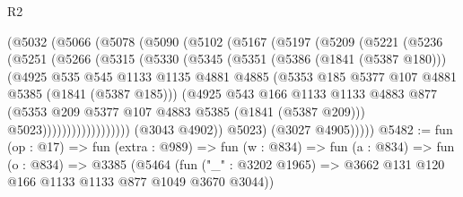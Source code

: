 \begin{lexlean}{R2}
\begin{coremodule}
                (@5032
                  (@5066
                    (@5078
                      (@5090
                        (@5102
                          (@5167
                            (@5197
                              (@5209
                                (@5221
                                  (@5236
                                    (@5251
                                      (@5266
                                        (@5315
                                          (@5330
                                            (@5345
                                              (@5351
                                                (@5386 (@1841 (@5387 @180)))
                                                (@4925
                                                  @535
                                                  @545
                                                  @1133
                                                  @1135
                                                  @4881
                                                  @4885
                                                  (@5353
                                                    @185
                                                    @5377
                                                    @107
                                                    @4881
                                                    @5385
                                                    (@1841 (@5387 @185)))
                                                  (@4925
                                                    @543
                                                    @166
                                                    @1133
                                                    @1133
                                                    @4883
                                                    @877
                                                    (@5353
                                                      @209
                                                      @5377
                                                      @107
                                                      @4883
                                                      @5385
                                                      (@1841 (@5387 @209)))
                                                    @5023))))))))))))))))))
                (@3043 @4902))
              @5023)
            (@3027 @4905)))))
@5482 := fun (op : @17) =>
  fun (extra : @989) =>
  fun (w : @834) =>
  fun (a : @834) =>
  fun (o : @834) =>
  @3385 (@5464 (fun ("_" : @3202 @1965) => @3662 @131 @120 @166 @1133 @1133 @877 @1049 @3670 @3044))

\end{coremodule}
\end{lexlean}
